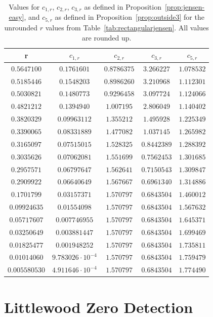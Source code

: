 \documentclass[10pt,english,letter, reqno]{amsart}
\theoremstyle{plain}
\theoremstyle{definition}
\begin{document}
\begin{table}
\caption{Values for $c_{1,r}$, $c_{2,r}$, $c_{3,r}$ as defined in Proposition~\ref{prop:jensen-easy}, and $c_{5,r}$ as defined in Proposition~\ref{prop:outside3} for the unrounded $r$ values from Table~\ref{tab:rectangularjensen}. All values are rounded up.}\label{tab:crvalues3}
\begin{tabular}{|c|cccc|}
\hline
r  & $c_{1,r}$& $c_{2,r}$& $c_{3,r}$& $c_{5,r}$\\
\hline
$0.5647100$&$0.1761601$&$0.8786375$&$3.266227$&$1.078532$\\
$0.5185446$&$0.1548203$&$0.8986260$&$3.210968$&$1.112301$\\
$0.5030821$&$0.1480773$&$0.9296458$&$3.097724$&$1.124066$\\
$0.4821212$&$0.1394940$&$1.007195$&$2.806049$&$1.140402$\\
$0.3820329$&$0.09963112$&$1.355212$&$1.495928$&$1.225349$\\
$0.3390065$&$0.08331889$&$1.477082$&$1.037145$&$1.265982$\\
$0.3165097$&$0.07515015$&$1.528325$&$0.8442389$&$1.288392$\\
$0.3035626$&$0.07062081$&$1.551699$&$0.7562453$&$1.301685$\\
$0.2957571$&$0.06797647$&$1.562641$&$0.7150543$&$1.309847$\\
$0.2909922$&$0.06640649$&$1.567667$&$0.6961340$&$1.314886$\\
$0.1701799$&$0.03157371$&$1.570797$&$0.6843504$&$1.460012$\\
$0.09924635$&$0.01554098$&$1.570797$&$0.6843504$&$1.567632$\\
$0.05717607$&$0.007746955$&$1.570797$&$0.6843504$&$1.645371$\\
$0.03250649$&$0.003881447$&$1.570797$&$0.6843504$&$1.699469$\\
$0.01825477$&$0.001948252$&$1.570797$&$0.6843504$&$1.735811$\\
$0.01014060$&$9.783026\cdot 10^{-4}$&$1.570797$&$0.6843504$&$1.759479$\\
$0.005580530$&$4.911646\cdot 10^{-4}$&$1.570797$&$0.6843504$&$1.774490$\\
\hline
\end{tabular}
\end{table}

\section{Littlewood Zero Detection}\label{sec:littlewood}
\end{document}
